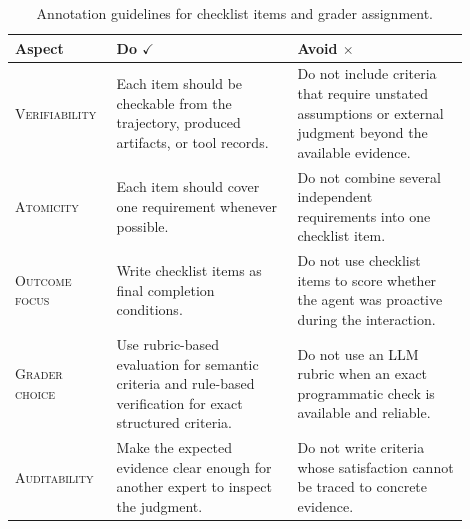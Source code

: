 \begin{table}[tb]
\centering
\caption{Annotation guidelines for checklist items and grader assignment.}
\label{tab:annotation_checklists}
\small
\begin{tabular}{p{0.18\linewidth}p{0.37\linewidth}p{0.35\linewidth}}
\toprule[1.25pt]
\textbf{Aspect} & \textbf{Do} $\checkmark$ & \textbf{Avoid} $\times$ \\
\midrule[0.75pt]
\textsc{Verifiability} &
Each item should be checkable from the trajectory, produced artifacts, or tool records. &
Do not include criteria that require unstated assumptions or external judgment beyond the available evidence. \\
\midrule[0.75pt]
\textsc{Atomicity} &
Each item should cover one requirement whenever possible. &
Do not combine several independent requirements into one checklist item. \\
\midrule[0.75pt]
\textsc{Outcome focus} &
Write checklist items as final completion conditions. &
Do not use checklist items to score whether the agent was proactive during the interaction. \\
\midrule[0.75pt]
\textsc{Grader choice} &
Use rubric-based evaluation for semantic criteria and rule-based verification for exact structured criteria. &
Do not use an LLM rubric when an exact programmatic check is available and reliable. \\
\midrule[0.75pt]
\textsc{Auditability} &
Make the expected evidence clear enough for another expert to inspect the judgment. &
Do not write criteria whose satisfaction cannot be traced to concrete evidence. \\
\bottomrule[1.25pt]
\end{tabular}
\end{table}